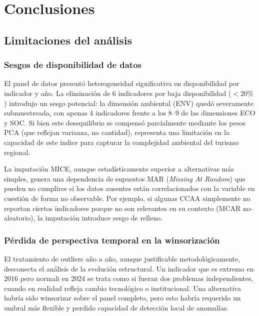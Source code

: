 \chapter{Conclusiones}

\section{Limitaciones del análisis}

\subsection{Sesgos de disponibilidad de datos}

El panel de datos presentó heterogeneidad significativa en disponibilidad por indicador y año. La eliminación de 6 indicadores por baja disponibilidad ($<20\%$) introdujo un sesgo potencial: la dimensión ambiental (ENV) quedó severamente submuestreada, con apenas 4 indicadores frente a los 8--9 de las dimensiones ECO y SOC. Si bien este desequilibrio se compensó parcialmente mediante los pesos PCA (que reflejan varianza, no cantidad), representa una limitación en la capacidad de este índice para capturar la complejidad ambiental del turismo regional.

La imputación MICE, aunque estadísticamente superior a alternativas más simples, genera una dependencia de supuestos MAR (\emph{Missing At Random}) que pueden no cumplirse si los datos ausentes están correlacionados con la variable en cuestión de forma no observable. Por ejemplo, si algunas CCAA simplemente no reportan ciertos indicadores porque no son relevantes en su contexto (MCAR no-aleatorio), la imputación introduce sesgo de relleno.

\subsection{Pérdida de perspectiva temporal en la winsorización}

El tratamiento de outliers año a año, aunque justificable metodológicamente, desconecta el análisis de la evolución estructural. Un indicador que es extremo en 2016 pero normali en 2024 se trata como si fueran dos problemas independientes, cuando en realidad refleja cambio tecnológico o institucional. Una alternativa habría sido winsorizar sobre el panel completo, pero esto habría requerido un umbral más flexible y perdido capacidad de detección local de anomalías.

